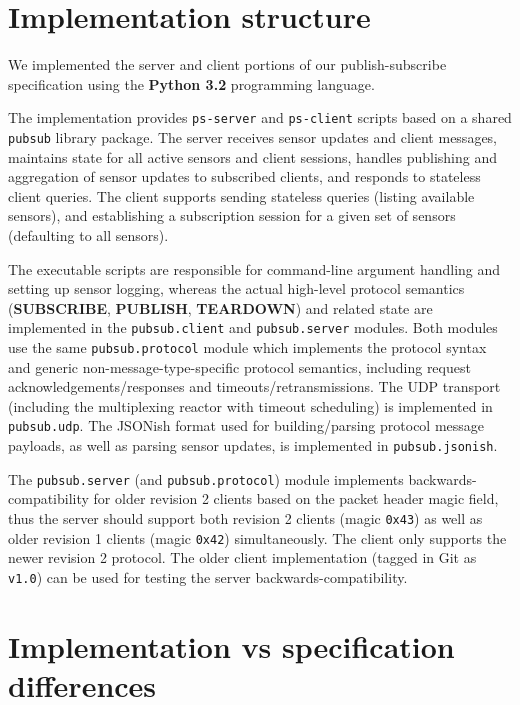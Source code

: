 \documentclass[a4paper]{article}
\begin{document}


\tableofcontents
\newpage

\section{Implementation structure}

We implemented the server and client portions of our publish-subscribe specification using the \textbf{Python 3.2} programming language.

The implementation provides \texttt{ps-server} and \texttt{ps-client} scripts based on a shared \texttt{pubsub} library package.
The server receives sensor updates and client messages, maintains state for all active sensors and client sessions, handles publishing and aggregation of sensor updates to subscribed clients, and responds to stateless client queries.
The client supports sending stateless queries (listing available sensors), and establishing a subscription session for a given set of sensors (defaulting to all sensors).

The executable scripts are responsible for command-line argument handling and setting up sensor logging, whereas the actual high-level protocol semantics (\textbf{SUBSCRIBE}, \textbf{PUBLISH}, \textbf{TEARDOWN}) and related state are implemented in the \texttt{pubsub.client} and \texttt{pubsub.server} modules.
Both modules use the same \texttt{pubsub.protocol} module which implements the protocol syntax and generic non-message-type-specific protocol semantics, including request acknowledgements/responses and timeouts/retransmissions.
The UDP transport (including the multiplexing reactor with timeout scheduling) is implemented in \texttt{pubsub.udp}.
The JSONish format used for building/parsing protocol message payloads, as well as parsing sensor updates, is implemented in \texttt{pubsub.jsonish}.

The \texttt{pubsub.server} (and \texttt{pubsub.protocol}) module implements backwards-compatibility for older revision 2 clients based on the packet header magic field, thus the server should support both revision 2 clients (magic \texttt{0x43}) as well as older revision 1 clients (magic \texttt{0x42}) simultaneously.
The client only supports the newer revision 2 protocol.
The older client implementation (tagged in Git as \texttt{v1.0}) can be used for testing the server backwards-compatibility.

\section{Implementation vs specification differences}
\end{document}
